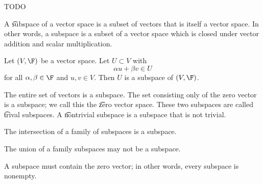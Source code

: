 

TODO


A \t{subspace} of a vector space is a subset of vectors that is itself a vector space.
In other words, a subspace is a subset of a vector space which is closed under vector addition and scalar multiplication.


Let $(V, \F)$ be a vector space.
Let $U \subset V$ with
$$
  \alpha u + \beta v \in U
$$
for all $\alpha, \beta \in \F$ and $u, v \in V$.
Then $U$ is a subspace of $(V, \F)$.


The entire set of vectors is a subspace.
The set consisting only of the zero vector is a subspace; we call this the \t{zero vector space}.
These two subspaces are called \t{trival subspaces}.
A \t{nontrivial subspace} is a subspace that is not trivial.


\begin{prop}
  The intersection of a family of subspaces is a subspace.
\end{prop}

\begin{prop}
  The union of a family subspaces may not be a subspace.
\end{prop}

\begin{prop}
  A subspace must contain the zero vector; in other words, every subspace is nonempty.
\end{prop}
